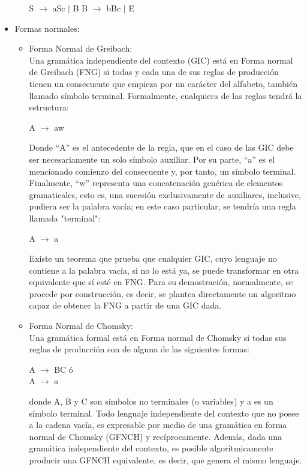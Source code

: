 \documentclass[12pt,a4paper,spanish]{book}
\begin{document}
\begin{itemize}
\begin{enumerate}
    S  $\rightarrow$ aSc $\mid$ B
    B $\rightarrow$ bBc $\mid$ E\\
\end{enumerate}
\item Formas normales:
\begin{itemize}
\item Forma Normal de Greibach:\\
\newline
Una gram\'atica independiente del contexto (GIC) est\'a en Forma normal de Greibach (FNG) si todas y cada una de sus reglas de producci\'on tienen un consecuente que empieza por un car\'acter del alfabeto, tambi\'en llamado s\'imbolo terminal. Formalmente, cualquiera de las reglas tendr\'a la estructura:\\
\begin{center}
A $\rightarrow$ aw
\end{center}
Donde ``A'' es el antecedente de la regla, que en el caso de las GIC debe ser necesariamente un solo s\'imbolo auxiliar. Por su parte, ``a'' es el mencionado comienzo del consecuente y, por tanto, un s\'imbolo terminal. Finalmente, ``w'' representa una concatenaci\'on gen\'erica de elementos gramaticales, esto es, una sucesi\'on exclusivamente de auxiliares, inclusive, pudiera ser la palabra vac\'ia; en este caso particular, se tendr\'ia una regla llamada "terminal":\\
\begin{center}
A $\rightarrow$ a
\end{center}
Existe un teorema que prueba que cualquier GIC, cuyo lenguaje no contiene a la palabra vac\'ia, si no lo est\'a ya, se puede transformar en otra equivalente que s\'i est\'e en FNG. Para su demostraci\'on, normalmente, se procede por construcci\'on, es decir, se plantea directamente un algoritmo capaz de obtener la FNG a partir de una GIC dada.\\
\item Forma Normal de Chomsky:\\
\newline
Una gram\'atica formal est\'a en Forma normal de Chomsky si todas sus reglas de producci\'on son de alguna de las siguientes formas:
\begin{center}
A $\rightarrow$ BC \'o\\
A $\rightarrow$ a\\
\end{center}
donde A, B y C son s\'imbolos no terminales (o variables) y a es un s\'imbolo terminal.
Todo lenguaje independiente del contexto que no posee a la cadena vac\'ia, es expresable por medio de una gram\'atica en forma normal de Chomsky (GFNCH) y rec\'iprocamente. Adem\'as, dada una gram\'atica independiente del contexto, es posible algor\'itmicamente producir una GFNCH equivalente, es decir, que genera el mismo lenguaje.
\end{itemize}
\end{itemize}
\end{document}

